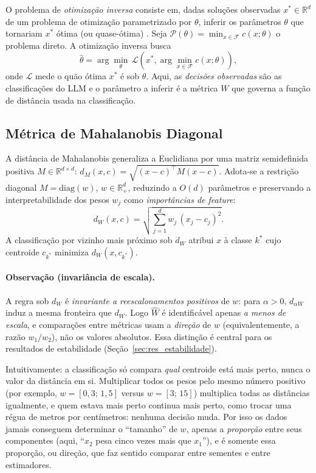 \documentclass[12pt,a4paper]{article}
\newcommand{\West}{\ensuremath{\hat{W}}}   %
\begin{document}
O problema de \emph{otimização inversa} consiste em, dadas soluções observadas
$x^* \in \mathbb{R}^d$ de um problema de otimização parametrizado por $\theta$, inferir os
parâmetros $\theta$ que tornariam $x^*$ ótima (ou quase-ótima) \cite{chanInverseOptimization2025}.
Seja $\mathcal{P}(\theta) = \min_{x \in \mathcal{F}} c(x; \theta)$ o problema direto. A
otimização inversa busca
\begin{equation}
  \hat{\theta} = \arg\min_{\theta} \,
  \mathcal{L}\!\left(x^*, \arg\min_{x \in \mathcal{F}} c(x; \theta)\right),
\end{equation}
onde $\mathcal{L}$ mede o quão ótima $x^*$ é sob $\theta$. Aqui, as \emph{decisões
observadas} são as classificações do LLM e o parâmetro a inferir é a métrica $W$ que governa
a função de distância usada na classificação.

\subsection{Métrica de Mahalanobis Diagonal}

A distância de Mahalanobis generaliza a Euclidiana por uma matriz semidefinida positiva
$M \in \mathbb{R}^{d \times d}$: $d_M(x,c) = \sqrt{(x-c)^\top M (x-c)}$. Adota-se a
restrição diagonal $M = \mathrm{diag}(w)$, $w \in \mathbb{R}^d_+$, reduzindo a $O(d)$
parâmetros e preservando a interpretabilidade dos pesos $w_j$ como \emph{importâncias de
feature}:
\begin{equation}
  d_W(x, c) = \sqrt{\sum_{j=1}^d w_j\,(x_j - c_j)^2}.
  \label{eq:mahalanobis}
\end{equation}
A classificação por vizinho mais próximo sob $d_W$ atribui $x$ à classe $k^*$ cujo centroide
$c_{k^*}$ minimiza $d_W(x, c_{k^*})$.

\paragraph{Observação (invariância de escala).}
A regra sob $d_W$ é \emph{invariante a reescalonamentos positivos} de $w$: para $\alpha>0$,
$d_{\alpha W}$ induz a mesma fronteira que $d_W$. Logo \West{} é identificável apenas
\emph{a menos de escala}, e comparações entre métricas usam a \emph{direção} de $w$
(equivalentemente, a razão $w_1/w_2$), não os valores absolutos. Essa distinção é central
para os resultados de estabilidade (Seção~\ref{sec:res_estabilidade}).

Intuitivamente: a classificação só compara \emph{qual} centroide está mais perto, nunca o
valor da distância em si. Multiplicar todos os pesos pelo mesmo número positivo (por
exemplo, $w = [0{,}3;\,1{,}5]$ versus $w = [3;\,15]$) multiplica todas as distâncias
igualmente, e quem estava mais perto continua mais perto, como trocar uma régua de metros
por centímetros: nenhuma decisão muda. Por isso os dados jamais conseguem determinar o
``tamanho'' de $w$, apenas a \emph{proporção} entre seus componentes (aqui, ``$x_2$ pesa
cinco vezes mais que $x_1$''), e é somente essa proporção, ou direção, que faz sentido
comparar entre sementes e entre estimadores.
\end{document}
